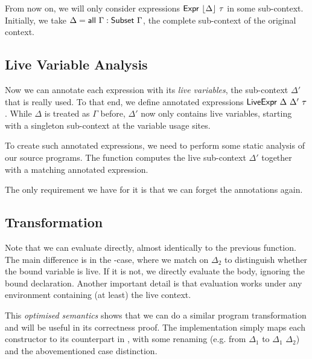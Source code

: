 \documentclass[11pt,a4paper]{article}
\newcommand{\AgdaFloor}[1]{\AgdaFunction{$\lfloor$}\AgdaSpace{}#1\AgdaSpace{}\AgdaFunction{$\rfloor$}}
\begin{document}
From now on, we will only consider expressions
$\AgdaDatatype{Expr}\ \AgdaFloor{\Delta}\ \tau$ in some sub-context.
Initially, we take $\Delta = \AgdaFunction{all}\ \Gamma : \AgdaDatatype{Subset}\ \Gamma$,
the complete sub-context of the original context.


\subsection{Live Variable Analysis}

Now we can annotate each expression with its \emph{live variables},
the sub-context $\Delta'$ that is really used.
To that end, we define annotated expressions
$\AgdaDatatype{LiveExpr}\ \Delta\ \Delta'\ \tau$.
While $\Delta$ is treated as $\Gamma$ before, $\Delta'$ now only contains live variables,
starting with a singleton sub-context at the variable usage sites.

\CodeLiveExpr

To create such annotated expressions, we need to perform
some static analysis of our source programs.
The function  computes the live sub-context $\Delta'$
together with a matching annotated expression.

\CodeLiveAnalyse

The only requirement we have for it is that we can forget the annotations again.

\CodeLiveForgetSignature

\CodeLiveAnalysePreservesSignature


\subsection{Transformation}

Note that we can evaluate  directly,
almost identically to the previous  function.
The main difference is in the -case,
where we match on $\Delta_2$ to distinguish whether the bound variable is live.
If it is not, we directly evaluate the body, ignoring the bound declaration.
Another important detail is that evaluation works under any environment containing (at least) the live context.

\CodeLiveEvalLive

This \emph{optimised semantics} shows that we can do a similar program transformation
and will be useful in its correctness proof.
The implementation simply maps each constructor to its counterpart in ,
with some renaming
(e.g. from \AgdaFloor{$\Delta_1$} to \AgdaFloor{$\Delta_1$ \AgdaFunction{$\cup$} $\Delta_2$})
and the abovementioned case distinction.
\end{document}
